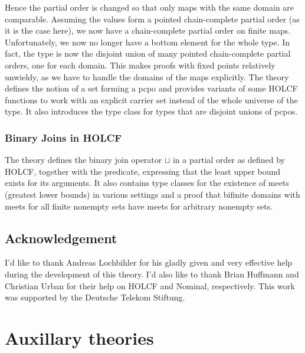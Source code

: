 \documentclass[11pt,a4paper,parskip=half]{scrartcl}
\begin{document}
Hence the partial order is changed so that only maps with the same domain are comparable. Assuming the values form a pointed chain-complete partial order (as it is the case here), we now have a chain-complete partial order on finite maps. Unfortunately, we now no longer have a bottom element for the whole type. In fact, the type is now the disjoint union of many pointed chain-complete partial orders, one for each domain. This makes proofs with fixed points relatively unwieldy, as we have to handle the domains of the maps explicitly. The theory  defines the notion of a set forming a pcpo and provides variants of some HOLCF functions to work with an explicit carrier set instead of the whole universe of the type. It also introduces the type class  for types that are disjoint unions of pcpos.

\subsubsection{Binary Joins in HOLCF}

The theory  defines the binary join operator $\sqcup$ in a partial order as defined by HOLCF, together with the  predicate, expressing that the least upper bound exists for its arguments. It also contains type classes for the existence of meets (greatest lower bounds) in various settings and a proof that bifinite domains with meets for all finite nonempty sets have meets for arbitrary nonempty sets.

\subsection{Acknowledgement}

I’d like to thank Andreas Lochbihler for his gladly given and very effective help during the development of this theory. I’d also like to thank Brian Huffmann and Christian Urban for their help on HOLCF and Nominal, respectively. This work was supported by the Deutsche Telekom Stiftung.

\clearpage
\newcommand{\theory}[1]{\subsection{#1}\label{sec_#1}}

\section{Auxillary theories}
\end{document}
